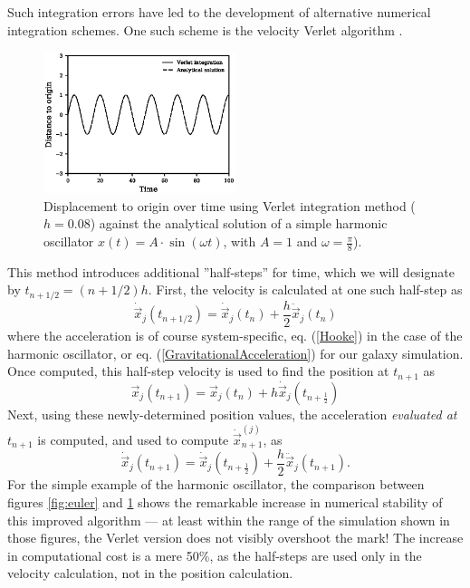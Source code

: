 \documentclass[11pt,twocolumn]{article}
\begin{document}
Such integration errors have led to the development of alternative numerical integration schemes. One such scheme is the velocity Verlet algorithm \cite{1967PhRv..159...98V}.
                \begin{figure}
                \centering
  				\includegraphics[width=0.5\textwidth]{num_st/verlet.eps}
  				\caption{Displacement to origin over time using Verlet integration method ($h = 0.08$) against the analytical solution of a simple harmonic oscillator $x(t) = A\cdot\sin(\omega t)$, with $A = 1$ and $\omega = \frac{\pi}{8}$).}
  				\label{fig:verlet}
				\end{figure}         
This method introduces additional ''half-steps'' for time, which we will designate by $t_{n+1/2} = (n+1/2)h$. First, the velocity is calculated at one such half-step as
                \begin{equation}
                \dot{\vec{x}}_j(t_{n+1/2}) = \dot{\vec{x}}_j(t_n)  +  \frac{h}{2} \ddot{\vec{x}}_j(t_n)
                \end{equation}
where the acceleration is of course system-specific, eq. (\ref{Hooke}) in the case of the harmonic oscillator, or eq. (\ref{GravitationalAcceleration}) for our galaxy simulation. Once computed, this half-step velocity is used to find the position at $t_{n+1}$ as                 
\begin{equation}
                {\vec{x}}_j(t_{n+1}) = {\vec{x}}_j(t_n) + h\dot{\vec{x}}_j(t_{n+\frac{1}{2}}) 
                \end{equation}
                Next, using these newly-determined position values, the acceleration {\em evaluated at} $t_{n+1}$ is computed, and used to 
                compute  $\dot{\vec{x}}_{n+1}^{(j)}$, as                
                \begin{equation}
				\dot{\vec{x}}_j(t_{n+1}) = \dot{\vec{x}}_j(t_{n + \frac{1}{2}}) + \frac{h}{2} \ddot{\vec{x}}_j(t_{n+1}).
                \end{equation}
For the simple example of the harmonic oscillator, the comparison between figures \ref{fig:euler} and \ref{fig:verlet} shows the remarkable increase in numerical stability of this improved algorithm --- at least within the range of the simulation shown in those figures, the Verlet version does not visibly overshoot the mark! The increase in computational cost is a mere 50\%, as the half-steps are used only in the velocity calculation, not in the position calculation.
           
\end{document}
